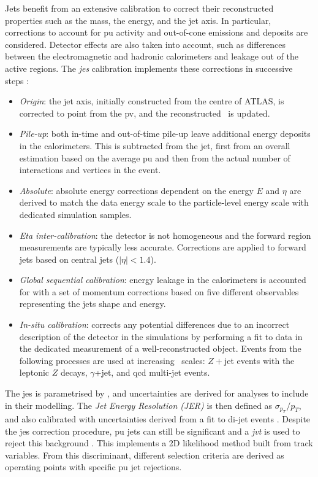 Jets benefit from an extensive calibration to correct their reconstructed properties such as the mass, the energy, and the jet axis. In particular, corrections to account for \gls{pu} activity and out-of-cone emissions and deposits are considered. Detector effects are also taken into account, such as differences between the electromagnetic and hadronic calorimeters and leakage out of the active regions. The \textit{\gls{jes}} calibration implements these corrections in successive steps \cite{ATLASjesjerMeas}: 
\begin{itemize}[leftmargin=*]
\item \textit{Origin}: the jet axis, initially constructed from the centre of ATLAS, is corrected to point from the \gls{pv}, and the reconstructed \pt\ is updated.
\item \textit{Pile-up}: both in-time and out-of-time pile-up leave additional energy deposits in the calorimeters. This is subtracted from the jet, first from an overall estimation based on the average \gls{pu} and then from the actual number of interactions and vertices in the event. 
\item \textit{Absolute}: absolute energy corrections dependent on the energy $E$ and $\eta$ are derived to match the data energy scale to the particle-level energy scale with dedicated simulation samples.
\item \textit{Eta inter-calibration}: the detector is not homogeneous and the forward region measurements are typically less accurate. Corrections are applied to forward jets based on central jets ($|\eta|<1.4$).
\item \textit{Global sequential calibration}: energy leakage in the calorimeters is accounted for with a set of momentum corrections based on five different observables representing the jets shape and energy.  
\item \textit{In-situ calibration}: corrects any potential differences due to an incorrect description of the detector in the simulations by performing a fit to data in the dedicated measurement of a well-reconstructed object. Events from the following processes are used at increasing \pt\ scales: $Z+$jet events with the leptonic $Z$ decays, $\gamma$+jet, and \gls{qcd} multi-jet events.
\end{itemize}
The \gls{jes} is parametrised by \pt, and uncertainties are derived for analyses to include in their modelling. The \textit{Jet Energy Resolution (JER)} is then defined as $\sigma_{p_T}/p_T$, and also calibrated with uncertainties derived from a fit to di-jet events \cite{ATLASjesjerMeas}. Despite the \gls{jes} correction procedure, \gls{pu} jets can still be significant and a \textit{\gls{jvt}} is used to reject this background \cite{ATLAS-CONF-2014-018}. This implements a 2D likelihood method built from track variables. From this discriminant, different selection criteria are derived as operating points with specific \gls{pu} jet rejections. 

